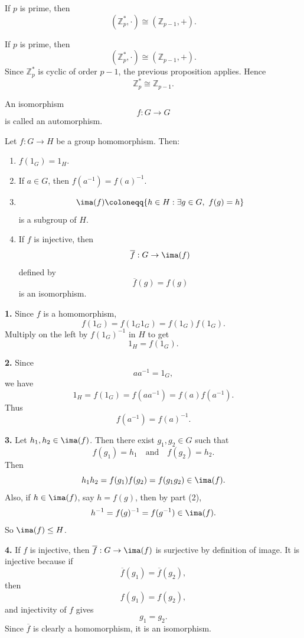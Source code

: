 \begin{example}
    If $p$ is prime, then
    \[
        (\mathbb{Z}_p^*,\cdot)\cong (\mathbb{Z}_{p-1},+).
    \]
\end{example}

\begin{proposition}{
    If $p$ is prime, then
    \[
        (\mathbb{Z}_p^*,\cdot)\cong (\mathbb{Z}_{p-1},+).
    \]
}
    Since $\mathbb{Z}_p^*$ is cyclic of order $p-1$, the previous proposition applies.
    Hence
    \[
        \mathbb{Z}_p^*\cong \mathbb{Z}_{p-1}.
    \]
\end{proposition}

\begin{definition}[Automorphism]
    An isomorphism
    \[
        f:G\to G
    \]
    is called an automorphism.
\end{definition}

\begin{theorem}{
    Let $f:G\to H$ be a group homomorphism.
    Then:
    \begin{enumerate}
        \item $f(1_G)=1_H$.
        \item If $a\in G$, then $f(a^{-1})=f(a)^{-1}$.
        \item
        \[
            \ima(f)\coloneqq \{h\in H:\exists g\in G,\ f(g)=h\}
        \]
        is a subgroup of $H$.
        \item If $f$ is injective, then
        \[
            \overline{f}:G\to \ima(f)
        \]
        defined by
        \[
            \overline{f}(g)=f(g)
        \]
        is an isomorphism.
    \end{enumerate}
}
    \textbf{1.}
    Since $f$ is a homomorphism,
    \[
        f(1_G)=f(1_{G}1_G)=f(1_G)f(1_G).
    \]
    Multiply on the left by $f(1_G)^{-1}$ in $H$ to get
    \[
        1_H=f(1_G).
    \]

    \textbf{2.}
    Since
    \[
        aa^{-1}=1_G,
    \]
    we have
    \[
        1_H=f(1_G)=f(aa^{-1})=f(a)f(a^{-1}).
    \]
    Thus
    \[
        f(a^{-1})=f(a)^{-1}.
    \]

    \textbf{3.}
    Let $h_1,h_2\in \ima(f)$.
    Then there exist $g_1,g_2\in G$ such that
    \[
        f(g_1)=h_1
        \quad\text{and}\quad
        f(g_2)=h_2.
    \]
    Then
    \[
        h_{1}h_2=f(g_1)f(g_2)=f(g_{1}g_2)\in \ima(f).
    \]
    Also, if $h\in \ima(f)$, say $h=f(g)$, then by part (2),
    \[
        h^{-1}=f(g)^{-1}=f(g^{-1})\in \ima(f).
    \]
    So $\ima(f)\leq H$.

    \textbf{4.}
    If $f$ is injective, then $\overline{f}:G\to \ima(f)$ is surjective by definition of image.
    It is injective because if
    \[
        \overline{f}(g_1)=\overline{f}(g_2),
    \]
    then
    \[
        f(g_1)=f(g_2),
    \]
    and injectivity of $f$ gives
    \[
        g_1=g_2.
    \]
    Since $\overline{f}$ is clearly a homomorphism, it is an isomorphism.
\end{theorem}

